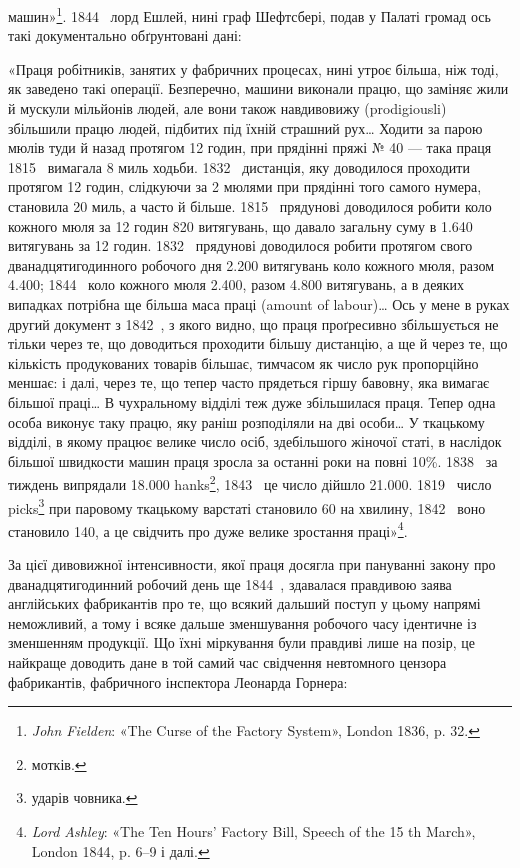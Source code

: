 \parcont{}  %
машин»\footnote{
\emph{John Fielden}: «The Curse of the Factory System», London
1836, p. 32.
}. 1844~ лорд Ешлей, нині граф Шефтсбері, подав
у Палаті громад ось такі документально обґрунтовані дані:

«Праця робітників, занятих у фабричних процесах, нині утроє
більша, ніж тоді, як заведено такі операції. Безперечно, машини
виконали працю, що заміняє жили й мускули мільйонів людей,
але вони також навдивовижу (prodigiousli) збільшили працю
людей, підбитих під їхній страшний рух\dots{} Ходити за парою
мюлів туди й назад протягом 12 годин, при прядінні пряжі
№ 40 — така праця 1815~ вимагала 8 миль ходьби. 1832~
дистанція, яку доводилося проходити протягом 12 годин, слідкуючи
за 2 мюлями при прядінні того самого нумера, становила
20 миль, а часто й більше. 1815~ прядунові доводилося робити
коло кожного мюля за 12 годин 820 витягувань, що давало загальну
суму в \num{1.640} витягувань за 12 годин. 1832~ прядунові
доводилося робити протягом свого дванадцятигодинного робочого
дня \num{2.200} витягувань коло кожного мюля, разом \num{4.400}; 1844~
коло кожного мюля \num{2.400}, разом \num{4.800} витягувань, а в деяких
випадках потрібна ще більша маса праці (amount of labour)\dots{}
Ось у мене в руках другий документ з 1842~, з якого видно,
що праця проґресивно збільшується не тільки через те, що доводиться
проходити більшу дистанцію, а ще й через те, що кількість
продукованих товарів більшає, тимчасом як число рук пропорційно
меншає: і далі, через те, що тепер часто прядеться гіршу
бавовну, яка вимагає більшої праці\dots{} В чухральному відділі
теж дуже збільшилася праця. Тепер одна особа виконує таку
працю, яку раніш розподіляли на дві особи\dots{} У ткацькому відділі,
в якому працює велике число осіб, здебільшого жіночої
статі, в наслідок більшої швидкости машин праця зросла за
останні роки на повні 10\%. 1838~ за тиждень випрядали \num{18.000}
hanks\footnote*{
мотків. 
}, 1843~ це число дійшло \num{21.000}. 1819~ число picks\footnote*{
ударів човника. 
}
при паровому ткацькому варстаті становило 60 на хвилину, 1842~
воно становило 140, а це свідчить про дуже велике зростання
праці»\footnote{
\emph{Lord Ashley}: «The Ten Hours’ Factory Bill, Speech of the 15 th
March», London 1844, p. 6--9 і далі.
}.

За цієї дивовижної інтенсивности, якої праця досягла при пануванні
закону про дванадцятигодинний робочий день ще 1844~,
здавалася правдивою заява англійських фабрикантів про те,
що всякий дальший поступ у цьому напрямі неможливий, а
тому і всяке дальше зменшування робочого часу ідентичне із
зменшенням продукції. Що їхні міркування були правдиві лише
на позір, це найкраще доводить дане в той самий час свідчення
невтомного цензора фабрикантів, фабричного інспектора Леонарда
Горнера:
